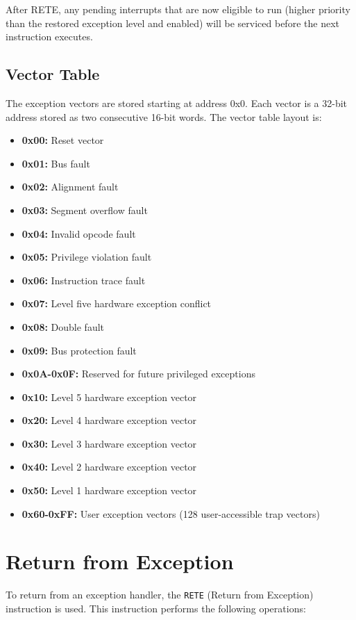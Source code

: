 After RETE, any pending interrupts that are now eligible to run (higher priority than the restored exception level and
enabled) will be serviced before the next instruction executes.

\subsection{Vector Table}

The exception vectors are stored starting at address 0x0. Each vector is a 32-bit address stored as two consecutive
16-bit words. The vector table layout is:

\begin{itemize}
	\item \textbf{0x00:} Reset vector
	\item \textbf{0x01:} Bus fault
	\item \textbf{0x02:} Alignment fault
	\item \textbf{0x03:} Segment overflow fault
	\item \textbf{0x04:} Invalid opcode fault
	\item \textbf{0x05:} Privilege violation fault
	\item \textbf{0x06:} Instruction trace fault
	\item \textbf{0x07:} Level five hardware exception conflict
	\item \textbf{0x08:} Double fault
	\item \textbf{0x09:} Bus protection fault
	\item \textbf{0x0A-0x0F:} Reserved for future privileged exceptions
	\item \textbf{0x10:} Level 5 hardware exception vector
	\item \textbf{0x20:} Level 4 hardware exception vector
	\item \textbf{0x30:} Level 3 hardware exception vector
	\item \textbf{0x40:} Level 2 hardware exception vector
	\item \textbf{0x50:} Level 1 hardware exception vector
	\item \textbf{0x60-0xFF:} User exception vectors (128 user-accessible trap vectors)
\end{itemize}

\section{Return from Exception}

To return from an exception handler, the \texttt{RETE} (Return from Exception) instruction is used. This instruction
performs the following operations:

